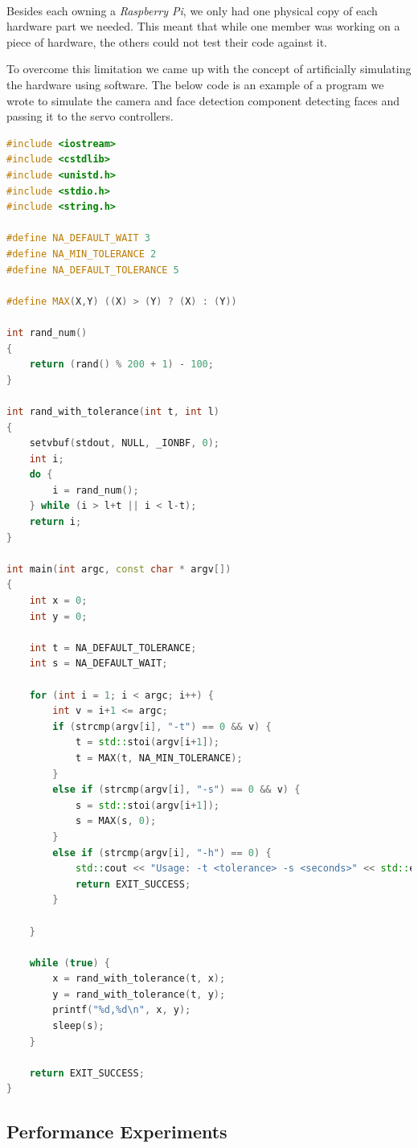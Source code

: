 \documentclass[11pt,a4paper,titlepage]{report}
\newcommand{\rpi}{\textit{Raspberry Pi\textsuperscript{\textregistered}}}
\begin{document}
Besides each owning a \rpi, we only had one physical copy of each hardware part we needed. This meant that while one member was working on a piece of hardware, the others could not test their code against it.

To overcome this limitation we came up with the concept of artificially simulating the hardware using software. The below code is an example of a program we wrote to simulate the camera and face detection component detecting faces and passing it to the servo controllers.

\begin{lstlisting}[caption=rand\_face\_detect.cpp,language=C++]
#include <iostream>
#include <cstdlib>
#include <unistd.h>
#include <stdio.h>
#include <string.h>

#define NA_DEFAULT_WAIT 3
#define NA_MIN_TOLERANCE 2
#define NA_DEFAULT_TOLERANCE 5

#define MAX(X,Y) ((X) > (Y) ? (X) : (Y))

int rand_num()
{
    return (rand() % 200 + 1) - 100;
}

int rand_with_tolerance(int t, int l)
{
    setvbuf(stdout, NULL, _IONBF, 0);
    int i;
    do {
        i = rand_num();
    } while (i > l+t || i < l-t);
    return i;
}

int main(int argc, const char * argv[])
{
    int x = 0;
    int y = 0;

    int t = NA_DEFAULT_TOLERANCE;
    int s = NA_DEFAULT_WAIT;

    for (int i = 1; i < argc; i++) {
        int v = i+1 <= argc;
        if (strcmp(argv[i], "-t") == 0 && v) {
            t = std::stoi(argv[i+1]);
            t = MAX(t, NA_MIN_TOLERANCE);
        }
        else if (strcmp(argv[i], "-s") == 0 && v) {
            s = std::stoi(argv[i+1]);
            s = MAX(s, 0);
        }
        else if (strcmp(argv[i], "-h") == 0) {
            std::cout << "Usage: -t <tolerance> -s <seconds>" << std::endl;
            return EXIT_SUCCESS;
        }

    }

    while (true) {
        x = rand_with_tolerance(t, x);
        y = rand_with_tolerance(t, y);
        printf("%d,%d\n", x, y);
        sleep(s);
    }

    return EXIT_SUCCESS;
}
\end{lstlisting}


\subsection{Performance Experiments}
\end{document}
